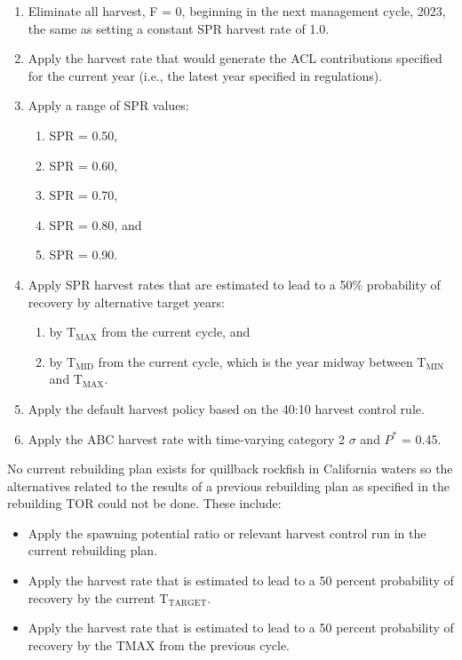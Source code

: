 \documentclass[11pt,
  english,
  a4paper,
]{article}
\begin{document}
\leavevmode\tagmcend\tagstructend\par

\begin{enumerate}
    \item Eliminate all harvest, F = 0, beginning in the next management cycle, 2023, the same as setting a constant SPR harvest rate of 1.0.
    \item Apply the harvest rate that would generate the ACL contributions specified for the current year (i.e., the latest year specified in regulations).
    \item Apply a range of SPR values: 
    \begin{enumerate}
     \item SPR = 0.50,
     \item SPR = 0.60,
     \item SPR = 0.70,
     \item SPR = 0.80, and
     \item SPR = 0.90. 
    \end{enumerate}
    \item Apply SPR harvest rates that are estimated to lead to a 50$\%$ probability of recovery by alternative target years: 
    \begin{enumerate}
     \item by $\text{T}_\text{MAX}$ from the current cycle, and 
     \item by $\text{T}_\text{MID}$ from the current cycle, which is the year midway between $\text{T}_\text{MIN}$ and $\text{T}_\text{MAX}$.
    \end{enumerate}
    \item Apply the default harvest policy based on the 40:10 harvest control rule.
    \item Apply the ABC harvest rate with time-varying category 2 $\sigma$ and $P^*$ = 0.45.
\end{enumerate}


No current rebuilding plan exists for quillback rockfish in California waters so the alternatives related to the results of a previous rebuilding plan as specified in the rebuilding TOR could not be done. These include:

\leavevmode\tagmcend\tagstructend\par

\begin{itemize}
 \item Apply the spawning potential ratio or relevant harvest control run in the current rebuilding plan. 
 \item Apply the harvest rate that is estimated to lead to a 50 percent probability of recovery by the current $\text{T}_\text{TARGET}$.
 \item Apply the harvest rate that is estimated to lead to a 50 percent probability of recovery by the TMAX from the previous cycle.
\end{itemize}
\end{document}
